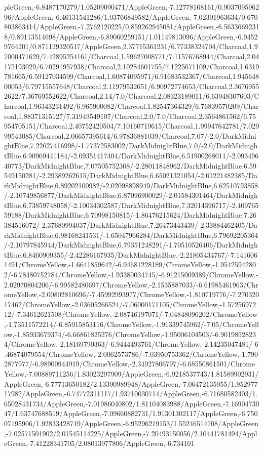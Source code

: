 {\begin{tikzternal}
pleGreen,-6.8487170279/1.05209090471/AppleGreen,-7.12778168161/0.903709596296/AppleGreen,-6.46131541286/1.03766849582/AppleGreen,-7.02301963634/0.670803863414/AppleGreen,-7.2762120225/0.859262945081/AppleGreen,-6.56336692318/0.89113514698/AppleGreen,-6.89060259151/1.01149813096/AppleGreen,-6.94529764201/0.871129320517/AppleGreen,2.37715361231/6.77338324704/Charcoal,1.97000471629/7.42895254161/Charcoal,1.59627008771/7.11576768944/Charcoal,2.04175193029/6.70291957938/Charcoal,2.10284601755/7.1225671109/Charcoal,1.6319781665/6.59127034599/Charcoal,1.60874095971/6.91683532367/Charcoal,1.94564800053/6.79715557648/Charcoal,2.11979532651/6.90972774653/Charcoal,2.36769552622/7.36769552622/Charcoal,2.14/7.0/Charcoal,2.08323189011/6.63948307603/Charcoal,1.96343231492/6.965900082/Charcoal,1.82547364329/6.76839570209/Charcoal,1.88371315127/7.31949549107/Charcoal,2.0/7.0/Charcoal,2.3564861562/6.75954705151/Charcoal,2.40752420504/7.10160719615/Charcoal,1.99947642781/7.02999543085/Charcoal,2.06657395614/6.97836881039/Charcoal,7.07/-2.0/DarkMidnightBlue,7.22627416998/-1.77372583002/DarkMidnightBlue,7.0/-2.0/DarkMidnightBlue,6.90969441184/-2.09351417404/DarkMidnightBlue,6.51900268011/-2.09349640773/DarkMidnightBlue,7.07505752308/-2.28011848962/DarkMidnightBlue,6.59549150281/-2.29389262615/DarkMidnightBlue,6.65021321054/-2.01221482385/DarkMidnightBlue,6.89202100982/-2.02098898949/DarkMidnightBlue,6.62510793858/-2.10749856877/DarkMidnightBlue,6.87096900029/-2.01584301464/DarkMidnightBlue,6.73859748058/-2.10034302587/DarkMidnightBlue,7.32014396717/-2.40976559188/DarkMidnightBlue,6.70998150815/-1.86476215624/DarkMidnightBlue,7.26384516072/-2.37680994037/DarkMidnightBlue,7.26473443439/-2.33884462405/DarkMidnightBlue,6.98168241531/-1.65047966284/DarkMidnightBlue,6.79692205364/-2.10797845944/DarkMidnightBlue,6.79351248291/-1.70510526406/DarkMidnightBlue,6.8460909355/-2.42286167935/DarkMidnightBlue,-2.21805434767/-7.1416061491/ChromeYellow,-1.6641859642/-6.94681228189/ChromeYellow,-1.95425942802/-6.78480752784/ChromeYellow,-1.93380034745/-6.91215009389/ChromeYellow,-2.02970804206/-6.99582480697/ChromeYellow,-2.1535887033/-6.61985461963/ChromeYellow,-2.00802810696/-7.45992993977/ChromeYellow,-1.810719776/-7.27032017462/ChromeYellow,-2.03605266524/-7.06000171105/ChromeYellow,-1.5725697212/-7.34612621508/ChromeYellow,-2.08746197071/-7.04848096202/ChromeYellow,-1.73511572214/-6.85915853116/ChromeYellow,-1.91339745962/-7.05/ChromeYellow,-1.85933679374/-6.66861825276/ChromeYellow,-1.95006104503/-6.90198928234/ChromeYellow,-2.18169790363/-6.9444493761/ChromeYellow,-2.14235047481/-6.46874079554/ChromeYellow,-2.0062573786/-7.03950753362/ChromeYellow,-1.7902877977/-6.98900944919/ChromeYellow,-2.34927806797/-6.68550861501/ChromeYellow,-7.00889711256/1.83023297909/AppleGreen,-6.9218537743/1.81589902931/AppleGreen,-6.77713650182/2.13390989948/AppleGreen,-7.06472135955/1.95297717982/AppleGreen,-6.74772311117/1.93710030714/AppleGreen,-6.71680582403/1.65028431734/AppleGreen,-7.01986040802/1.81104083988/AppleGreen,-7.1690473047/1.63747688519/AppleGreen,-7.09660882731/1.91301302117/AppleGreen,-6.75007195906/1.92833428749/AppleGreen,-6.95296219153/1.55246514708/AppleGreen,-7.02571501902/2.01545114225/AppleGreen,-7.20493150056/2.10441781494/AppleGreen,-7.41228341705/2.08013977806/AppleGreen,-6.734101
\end{tikzternal}}
